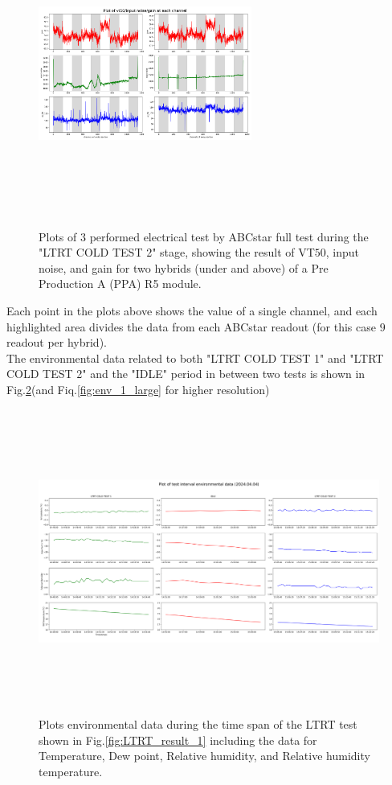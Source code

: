 \begin{figure}[h]
    \centering
    \includegraphics[width=7cm,height=10cm,keepaspectratio]{Figures/results/LTRT_2_plot.png}
    \caption{Plots of $3$ performed electrical test by ABCstar full test during the "LTRT COLD TEST 2" stage, showing the result of VT$50$, input noise, and gain for two hybrids (under and above) of a Pre Production A (PPA) R5 module.}
    \label{fig:LTRT_result_2}
\end{figure}

Each point in the plots above shows the value of a single channel, and each highlighted area divides the data from each ABCstar readout (for this case $9$ readout per hybrid).\\

The environmental data related to both "LTRT COLD TEST 1" and "LTRT COLD TEST 2" and the "IDLE" period in between two tests is shown in Fig.\ref{fig:env_1}(and Fiq.\ref{fig:env_1_large} for higher resolution)

\begin{figure}[h]
    \centering
    \includegraphics[width=12cm,height=10cm,keepaspectratio]{Figures/results/env_plot_20240404_.png}
    \caption{Plots environmental data during the time span of the LTRT test shown in Fig.\ref{fig:LTRT_result_1} including the data for Temperature, Dew point, Relative humidity, and Relative humidity temperature.}
    \label{fig:env_1}
\end{figure}

